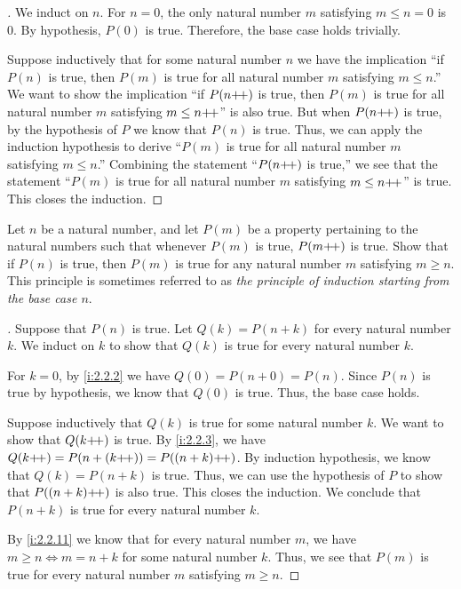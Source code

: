 \begin{proof}[]
  We induct on \(n\).
  For \(n = 0\), the only natural number \(m\) satisfying \(m \leq n = 0\) is \(0\).
  By hypothesis, \(P(0)\) is true.
  Therefore, the base case holds trivially.

  Suppose inductively that for some natural number \(n\) we have the implication ``if \(P(n)\) is true, then \(P(m)\) is true for all natural number \(m\) satisfying \(m \leq n\).''
  We want to show the implication ``if \(P(n{+}\!{+})\) is true, then \(P(m)\) is true for all natural number \(m\) satisfying \(m \leq n{+}\!{+}\)'' is also true.
  But when \(P(n{+}\!{+})\) is true, by the hypothesis of \(P\) we know that \(P(n)\) is true.
  Thus, we can apply the induction hypothesis to derive ``\(P(m)\) is true for all natural number \(m\) satisfying \(m \leq n\).''
  Combining the statement ``\(P(n{+}\!{+})\) is true,'' we see that the statement ``\(P(m)\) is true for all natural number \(m\) satisfying \(m \leq n{+}\!{+}\)'' is true.
  This closes the induction.
\end{proof}

\begin{ex}\label{i:ex:2.2.7}
  Let \(n\) be a natural number, and let \(P(m)\) be a property pertaining to the natural numbers such that whenever \(P(m)\) is true, \(P(m{+}\!{+})\) is true.
  Show that if \(P(n)\) is true, then \(P(m)\) is true for any natural number \(m\) satisfying \(m \geq n\).
  This principle is sometimes referred to as \emph{the principle of induction starting from the base case \(n\)}.
\end{ex}

\begin{proof}[]
  Suppose that \(P(n)\) is true.
  Let \(Q(k) = P(n + k)\) for every natural number \(k\).
  We induct on \(k\) to show that \(Q(k)\) is true for every natural number \(k\).

  For \(k = 0\), by \cref{i:2.2.2} we have \(Q(0) = P(n + 0) = P(n)\).
  Since \(P(n)\) is true by hypothesis, we know that \(Q(0)\) is true.
  Thus, the base case holds.

  Suppose inductively that \(Q(k)\) is true for some natural number \(k\).
  We want to show that \(Q(k{+}\!{+})\) is true.
  By \cref{i:2.2.3}, we have \(Q(k{+}\!{+}) = P(n + (k{+}\!{+})) = P((n + k){+}\!{+})\).
  By induction hypothesis, we know that \(Q(k) = P(n + k)\) is true.
  Thus, we can use the hypothesis of \(P\) to show that \(P((n + k){+}\!{+})\) is also true.
  This closes the induction.
  We conclude that \(P(n + k)\) is true for every natural number \(k\).

  By \cref{i:2.2.11} we know that for every natural number \(m\), we have \(m \geq n \iff m = n + k\) for some natural number \(k\).
  Thus, we see that \(P(m)\) is true for every natural number \(m\) satisfying \(m \geq n\).
\end{proof}

